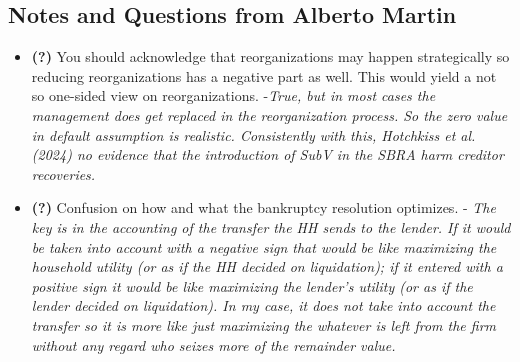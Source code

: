 \documentclass[12pt]{article}
\begin{document}
\subsection*{Notes and Questions from Alberto Martin}
\begin{itemize} \setlength\itemsep{0em}  \small
    \item \textbf{(?)} You should acknowledge that reorganizations may happen strategically so reducing reorganizations has a negative part as well. This would yield a not so one-sided view on reorganizations. -\textit{True, but in most cases the management does get replaced in the reorganization process. So the zero value in default assumption is realistic. Consistently with this, Hotchkiss et al. (2024) no evidence that the introduction of SubV in the SBRA harm creditor recoveries.}
    \item \textbf{(?)} Confusion on how and what the bankruptcy resolution optimizes. - \textit{The key is in the accounting of the transfer the HH sends to the lender. If it would be taken into account with a negative sign that would be like maximizing the household utility (or as if the HH decided on liquidation); if it entered with a positive sign it would be like maximizing the lender's utility (or as if the lender decided on liquidation). In my case, it does not take into account the transfer so it is more like just maximizing the whatever is left from the firm without any regard who seizes more of the remainder value.}
\end{itemize} \normalsize

\newpage 
\end{document}
